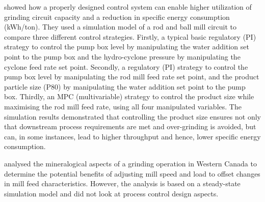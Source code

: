 \cite{bouchard_reducing_2017} showed how a properly designed control system can enable higher utilization of grinding circuit capacity and a reduction in specific energy consumption (kWh/ton). They used a simulation model of a rod and ball mill circuit to compare three different control strategies. Firstly, a typical basic regulatory (PI) strategy to control the pump box level by manipulating the water addition set point to the pump box and the hydro-cyclone pressure by manipulating the cyclone feed rate set point. Secondly, a regulatory (PI) strategy to control the pump box level by manipulating the rod mill feed rate set point, and the product particle size (P80) by manipulating the water addition set point to the pump box. Thirdly, an MPC (multivariable) strategy to control the product size while maximising the rod mill feed rate, using all four manipulated variables. The simulation results demonstrated that controlling the product size ensures not only that downstream process requirements are met and over-grinding is avoided, but can, in some instances, lead to higher throughput and hence, lower specific energy consumption.

\cite{liu_development_2018} analysed the mineralogical aspects of a grinding operation in Western Canada to determine the potential benefits of adjusting mill speed and load to offset changes in mill feed characteristics. However, the analysis is based on a steady-state simulation model and did not look at process control design aspects.


%

